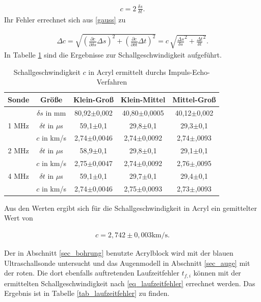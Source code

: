 \begin{align}
 c = 2\, \frac{\delta s}{\delta t}.
\end{align}
Ihr Fehler errechnet sich aus \eqref{gauss} zu

\begin{align}
 \Delta c = \sqrt{\left(\frac{\partial c}{\partial \delta s} \Delta s \right)^2 + \left(\frac{\partial c}{\partial \delta t} \Delta t \right)^2} = c\, \sqrt{\frac{\Delta s}{\delta s}^2 + \frac{\Delta t}{\delta t}^2}.
\end{align}
In Tabelle \ref{tab_schall} sind die Ergebnisse zur Schallgeschwindigkeit aufgeführt. 
\renewcommand{\arraystretch}{1.5}
\begin{table}[H]
 \begin{tabular}{c|c|c|c|c}
Sonde & Größe & Klein-Groß & Klein-Mittel & Mittel-Groß\\
\hline
&$\delta s$ in mm	&	80,92$\pm$0,002&	40,80$\pm$0,0005&	40,12$\pm$0,002\\
\hline
\hline
1 MHz &$\delta t$ in $\mu$s &59,1$\pm$0,1&	29,8$\pm$0,1&	29,3$\pm$0,1\\
&$c$ in km/s		&2,74$\pm$0,0046&	2,74$\pm$0,0092	&	2,74$\pm$,0093\\
\hline
2 MHz &$\delta t$ in $\mu$s &	58,9$\pm$0,1&	29,8$\pm$0,1&	29,1$\pm$0,1\\
&$c$ in km/s		&2,75$\pm$0,0047&	2,74$\pm$0,0092	&	2,76$\pm$,0095\\
\hline
4 MHz &$\delta t$ in $\mu$s &	59,1$\pm$0,1&	29,7$\pm$0,1&	29,4$\pm$0,1\\
&$c$ in km/s		&2,74$\pm$0,0046&	2,75$\pm$0,0093&	2,73$\pm$,0093\\
 \end{tabular}
\caption{Schallgeschwindigkeit $c$ in Acryl ermittelt durchs Impuls-Echo-Verfahren}
\label{tab_schall}
\end{table}
\renewcommand{\arraystretch}{1.0}
Aus den Werten ergibt sich für die Schallgeschwindigkeit in Acryl ein gemittelter Wert von

\begin{align}
 c = 2,742\pm0,003 \text{km/s}.
\end{align}

Der in Abschnitt \ref{sec_bohrung} benutzte Acrylblock wird mit der blauen Ultraschallsonde untersucht und das Augenmodell in Abschnitt 
\ref{sec_auge} mit der roten. Die dort ebenfalls auftretenden Laufzeitfehler $t_{f,i}$ können mit der ermittelten Schallgeschwindigkeit 
nach \eqref{eq_laufzeitfehler} errechnet werden. Das Ergebnis ist in Tabelle \ref{tab_laufzeitfehler} zu finden.

